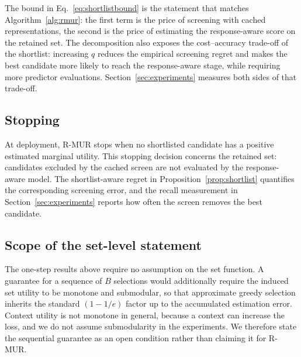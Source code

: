 The bound in Eq.~\eqref{eq:shortlistbound} is the statement that matches
Algorithm~\ref{alg:rmur}: the first term is the price of screening with cached
representations, the second is the price of estimating the response-aware score
on the retained set. The decomposition also exposes the cost--accuracy
trade-off of the shortlist: increasing $q$ reduces the empirical screening
regret and makes the best candidate more likely to reach the response-aware
stage, while requiring more predictor evaluations. Section~\ref{sec:experiments}
measures both sides of that trade-off.

\subsection{Stopping}

At deployment, R-MUR stops when no shortlisted candidate has a positive
estimated marginal utility. This stopping decision concerns the retained set:
candidates excluded by the cached screen are not evaluated by the response-aware
model. The shortlist-aware regret in Proposition~\ref{prop:shortlist}
quantifies the corresponding screening error, and the recall measurement in
Section~\ref{sec:experiments} reports how often the screen removes the best
candidate.

\subsection{Scope of the set-level statement}

The one-step results above require no assumption on the set function. A
guarantee for a sequence of $B$ selections would additionally require the
induced set utility to be monotone and submodular, so that approximate greedy
selection inherits the standard $(1-1/e)$ factor up to the accumulated
estimation error. Context utility is not monotone in general, because a context
can increase the loss, and we do not assume submodularity in the experiments.
We therefore state the sequential guarantee as an open condition rather than
claiming it for R-MUR.
